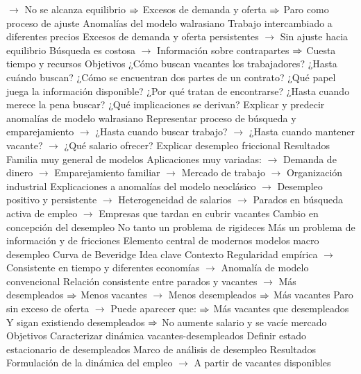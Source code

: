 \documentclass{nuevotema}
\begin{document}
\begin{esquemal}
				\4[] $\to$ No se alcanza equilibrio
				\4[] $\then$ Excesos de demanda y oferta
				\4[] $\then$ Paro como proceso de ajuste
				\4 Anomalías del modelo walrasiano
				\4[] Trabajo intercambiado a diferentes precios
				\4[] Excesos de demanda y oferta persistentes
				\4[] $\to$ Sin ajuste hacia equilibrio
				\4[] Búsqueda es costosa
				\4[] $\to$ Información sobre contrapartes
				\4[] $\then$ Cuesta tiempo y recursos
			\3 Objetivos
				\4 ¿Cómo buscan vacantes los trabajadores?
				\4 ¿Hasta cuándo buscan?
				\4 ¿Cómo se encuentran dos partes de un contrato?
				\4 ¿Qué papel juega la información disponible?
				\4 ¿Por qué tratan de encontrarse?
				\4 ¿Hasta cuando merece la pena buscar?
				\4 ¿Qué implicaciones se derivan?
				\4 Explicar y predecir anomalías de modelo walrasiano
				\4[] Representar proceso de búsqueda y emparejamiento
				\4[] $\to$ ¿Hasta cuando buscar trabajo?
				\4[] $\to$ ¿Hasta cuando mantener vacante?
				\4[] $\to$ ¿Qué salario ofrecer?
				\4[$\then$] Explicar desempleo friccional
			\3 Resultados
				\4 Familia muy general de modelos
				\4[] Aplicaciones muy variadas:
				\4[] $\to$ Demanda de dinero
				\4[] $\to$ Emparejamiento familiar
				\4[] $\to$ Mercado de trabajo
				\4[] $\to$ Organización industrial
				\4 Explicaciones a anomalías del modelo neoclásico
				\4[] $\to$ Desempleo positivo y persistente
				\4[] $\to$ Heterogeneidad de salarios
				\4[] $\to$ Parados en búsqueda activa de empleo
				\4[] $\to$ Empresas que tardan en cubrir vacantes
				\4 Cambio en concepción del desempleo
				\4[] No tanto un problema de rigideces
				\4[] Más un problema de información y de fricciones
				\4 Elemento central de modernos modelos macro desempleo
		\2 Curva de Beveridge
			\3 Idea clave
				\4 Contexto
				\4[] Regularidad empírica
				\4[] $\to$ Consistente en tiempo y diferentes economías
				\4[] $\to$ Anomalía de modelo convencional
				\4[] Relación consistente entre parados y vacantes
				\4[] $\to$ Más desempleados $\then$ Menos vacantes
				\4[] $\to$ Menos desempleados $\then$ Más vacantes
				\4[] 
				\4[] Paro sin exceso de oferta
				\4[] $\to$ Puede aparecer que:
				\4[] $\then$ Más vacantes que desempleados
				\4[] Y sigan existiendo desempleados
				\4[] $\then$ No aumente salario y se vacíe mercado
				\4 Objetivos
				\4[] Caracterizar dinámica vacantes-desempleados
				\4[] Definir estado estacionario de desempleados
				\4[] Marco de análisis de desempleo
				\4 Resultados
				\4[] Formulación de la dinámica del empleo
				\4[] $\to$ A partir de vacantes disponibles

\end{esquemal}
\end{document}
